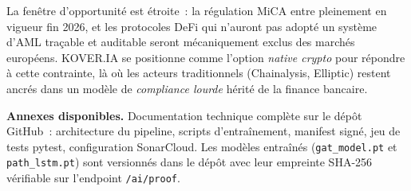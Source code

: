 \documentclass[11pt,a4paper]{article}
\begin{document}
\begin{quote_kv}
La fenêtre d'opportunité est étroite~: la régulation MiCA entre
pleinement en vigueur fin 2026, et les protocoles DeFi qui n'auront pas
adopté un système d'AML traçable et auditable seront mécaniquement
exclus des marchés européens. \textsc{KOVER.IA} se positionne comme
l'option \emph{native crypto} pour répondre à cette contrainte, là où
les acteurs traditionnels (Chainalysis, Elliptic) restent ancrés dans
un modèle de \emph{compliance lourde} hérité de la finance bancaire.
\end{quote_kv}

\vfill

\begin{insight}
\textbf{Annexes disponibles.} Documentation technique complète sur le
dépôt GitHub~: architecture du pipeline, scripts d'entraînement,
manifest signé, jeu de tests pytest, configuration SonarCloud. Les
modèles entraînés (\texttt{gat\_model.pt} et \texttt{path\_lstm.pt})
sont versionnés dans le dépôt avec leur empreinte SHA-256 vérifiable
sur l'endpoint \texttt{/ai/proof}.
\end{insight}
\end{document}
